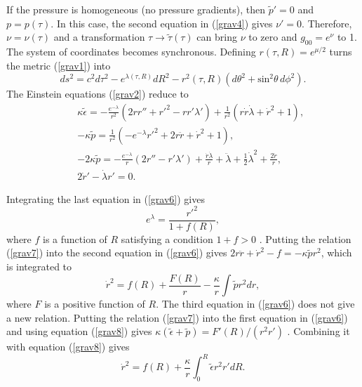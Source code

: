 \documentclass[prd,onecolumn,nofootinbib]{revtex4}
\begin{document}
If the pressure is homogeneous (no pressure gradients), then $\tilde{p}'=0$ and $p=p(\tau)$.
In this case, the second equation in (\ref{grav4}) gives $\nu'=0$.
Therefore, $\nu=\nu(\tau)$ and a transformation $\tau\rightarrow\tilde{\tau}(\tau)$ can bring $\nu$ to zero and $g_{00}=e^\nu$ to 1.
The system of coordinates becomes synchronous.
Defining $r(\tau,R)=e^{\mu/2}$ turns the metric (\ref{grav1}) into
\begin{equation}
    ds^2=c^2 d\tau^2-e^{\lambda(\tau,R)}dR^2-r^2(\tau,R)(d\theta^2+\mbox{sin}^2\theta\,d\phi^2).
    \label{grav5}
\end{equation}
The Einstein equations (\ref{grav2}) reduce to \cite{LL2}
\begin{eqnarray}
    & & \kappa\tilde{\epsilon}=-\frac{e^{-\lambda}}{r^2}(2rr''+r'^2-rr'\lambda')+\frac{1}{r^2}(r\dot{r}\dot{\lambda}+\dot{r}^2+1), \nonumber \\
    & & -\kappa\tilde{p}=\frac{1}{r^2}(-e^{-\lambda}r'^2+2r\ddot{r}+\dot{r}^2+1), \nonumber \\
    & & -2\kappa\tilde{p}=-\frac{e^{-\lambda}}{r}(2r''-r'\lambda')+\frac{\dot{r}\dot{\lambda}}{r}+\ddot{\lambda}+\frac{1}{2}\dot{\lambda}^2+\frac{2\ddot{r}}{r}, \nonumber \\
    & & 2\dot{r}'-\dot{\lambda}r'=0.
    \label{grav6}
\end{eqnarray}

Integrating the last equation in (\ref{grav6}) gives
\begin{equation}
    e^\lambda=\frac{r'^2}{1+f(R)},
    \label{grav7}
\end{equation}
where $f$ is a function of $R$ satisfying a condition $1+f>0$ \cite{LL2}.
Putting the relation (\ref{grav7}) into the second equation in (\ref{grav6}) gives $2r\ddot{r}+\dot{r}^2-f=-\kappa\tilde{p}r^2$, which is integrated to \cite{collapse}
\begin{equation}
    \dot{r}^2=f(R)+\frac{F(R)}{r}-\frac{\kappa}{r}\int\tilde{p}r^2 dr,
    \label{grav8}
\end{equation}
where $F$ is a positive function of $R$.
The third equation in (\ref{grav6}) does not give a new relation.
Putting the relation (\ref{grav7}) into the first equation in (\ref{grav6}) and using equation (\ref{grav8}) gives $\kappa(\tilde{\epsilon}+\tilde{p})=F'(R)/(r^2 r')$ \cite{collapse}.
Combining it with equation (\ref{grav8}) gives
\begin{equation}
    \dot{r}^2=f(R)+\frac{\kappa}{r}\int_0^R\tilde{\epsilon}r^2 r'dR.
    \label{grav10}
\end{equation}
\end{document}
